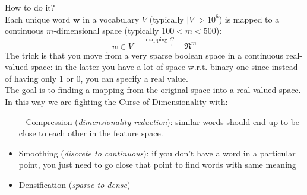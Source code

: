 How to do it? \\
Each unique word $\boldsymbol{w}$ in a vocabulary $V$ (typically $|V| > 10^6$) is mapped to a continuous $m$-dimensional space (typically $100 < m < 500$): 
$$
w \in V \quad \stackrel{\text { mapping } C}{\longrightarrow} \quad \mathfrak{R}^{m}
$$
The trick is that you move from a very sparse boolean space in a continuous real-valued space: in the latter you have a lot of space w.r.t. binary one since instead of having only 1 or 0, you can specify a real value. \\
The goal is to finding a mapping from the original space into a real-valued space. \\
In this way we are fighting the Curse of Dimensionality with:
\begin{itemize}
    \item[--] Compression (\textit{dimensionality reduction}): similar words should end up to be close to each other in the feature space. 
    \item Smoothing (\textit{discrete to continuous}): if you don't have a word in a particular point, you just need to go close that point to find words with same meaning
    \item Densification (\textit{sparse to dense})
\end{itemize}{}



